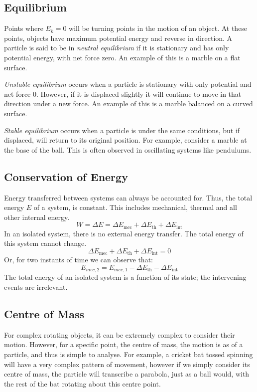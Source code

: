 \documentclass[12pt]{report}
\begin{document}
\begin{flushleft}
\subsection*{Equilibrium}
Points where \(E_k = 0\) will be turning points in the motion of an object. 
At these points, objects have maximum potential energy and reverse in 
direction. A particle is said to be in \textit{neutral equilibrium} if it is 
stationary and has only potential energy, with net force zero. An example of 
this is a marble on a flat surface.

\bigskip
\textit{Unstable equilibrium} occurs when a particle is stationary with only 
potential and net force \(0\). However, if it is displaced slightly it will 
continue to move in that direction under a new force. An example of this is a 
marble balanced on a curved surface.

\bigskip
\textit{Stable equilibrium} occurs when a particle is under the same 
conditions, but if displaced, will return to its original position. For 
example, consider a marble at the base of the ball. This is often observed in
oscillating systems like pendulums.

\subsection*{Conservation of Energy}
Energy transferred between systems can always be accounted for. Thus, the total
energy \(E\) of a system, is constant. This includes mechanical, thermal and 
all other internal energy.
\[W = \Delta E = \Delta E_\mathrm{mec} + 
\Delta E_\mathrm{th} + \Delta E_\mathrm{int}\]
In an isolated system, there is no external energy transfer. The total energy
of this system cannot change.
\[\Delta E_\mathrm{mec} + \Delta E_\mathrm{th} + \Delta E_\mathrm{int} = 0\]
Or, for two instants of time we can observe that:
\[E_{mec,2} = E_{mec,1} - \Delta E_\mathrm{th} - \Delta E_\mathrm{int}\]
The total energy of an isolated system is a function of its state; the
intervening events are irrelevant.

\subsection*{Centre of Mass}
For complex rotating objects, it can be extremely complex to consider their 
motion. However, for a specific point, the centre of mass, the motion is as of
a particle, and thus is simple to analyse. For example, a cricket bat tossed 
spinning will have a very complex pattern of movement, however if we simply 
consider its centre of mass, the particle will transcribe a parabola, just as a
ball would, with the rest of the bat rotating about this centre point.


\end{flushleft}
\end{document}
